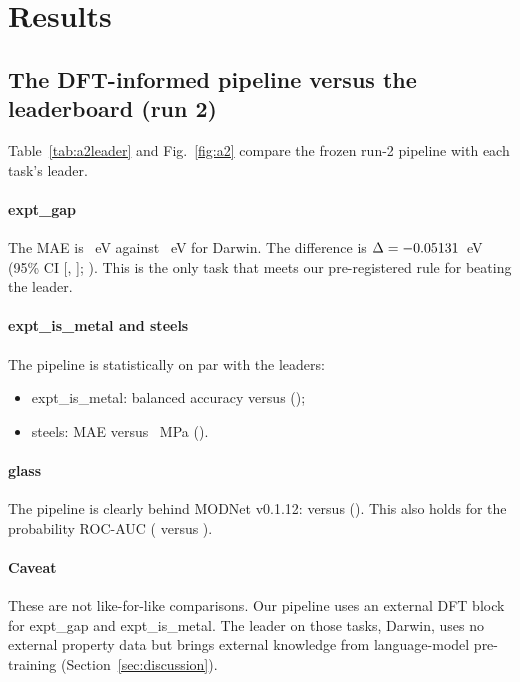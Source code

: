 \section{Results}
\label{sec:results}

\subsection{The DFT-informed pipeline versus the leaderboard (run 2)}
Table~\ref{tab:a2leader} and Fig.~\ref{fig:a2} compare the frozen run-2 pipeline with each task's leader.

\paragraph{expt\_gap}
The MAE is \AtwoFinalGap{}~eV against \AtwoLeaderGap{}~eV for Darwin. The difference is $\Delta=-0.05131$~eV (95\% CI [\AtwoCIloGap, \AtwoCIhiGap]; \AtwoPHolmExprGap). This is the only task that meets our pre-registered rule for beating the leader.

\paragraph{expt\_is\_metal and steels}
The pipeline is statistically on par with the leaders:
\begin{itemize}
\item expt\_is\_metal: balanced accuracy \AtwoFinalMetal{} versus \AtwoLeaderMetal{} (\AtwoPHolmExprMetal);
\item steels: MAE \AtwoFinalSteels{} versus \AtwoLeaderSteels~MPa (\AtwoPHolmExprSteels).
\end{itemize}

\paragraph{glass}
The pipeline is clearly behind MODNet v0.1.12: \AtwoFinalGlass{} versus \AtwoLeaderGlass{} (\AtwoPHolmExprGlass). This also holds for the probability ROC-AUC (\AtwoAUCGlass{} versus \AtwoLeaderAUCGlass).

\paragraph{Caveat}
These are not like-for-like comparisons. Our pipeline uses an external DFT block for expt\_gap and expt\_is\_metal. The leader on those tasks, Darwin, uses no external property data but brings external knowledge from language-model pre-training (Section~\ref{sec:discussion}).


